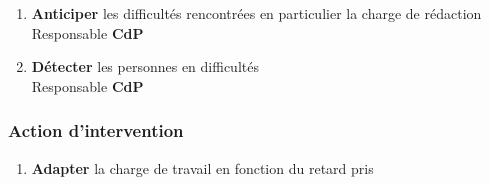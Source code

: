 \begin{enumerate}
\item {\bf Anticiper} les difficultés rencontrées en particulier la charge de rédaction \\ Responsable {\bf CdP}
\item {\bf Détecter} les personnes en difficultés \\ Responsable {\bf CdP}
\end{enumerate}

\subsubsection{Action d'intervention}

\begin{enumerate}
\item {\bf Adapter} la charge de travail en fonction du retard pris
\end{enumerate}
